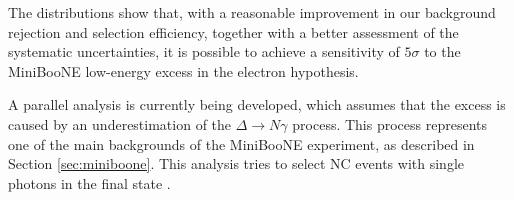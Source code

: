 The distributions show that, with a reasonable improvement in our background rejection and selection efficiency, together with a better assessment of the systematic uncertainties, it is possible to achieve a sensitivity of $5\sigma$ to the MiniBooNE low-energy excess in the electron hypothesis. 

A parallel analysis is currently being developed, which assumes that the excess is caused by an underestimation of the $\Delta\rightarrow N\gamma$ process. This process represents one of the main backgrounds of the MiniBooNE experiment, as described in Section \ref{sec:miniboone}. This analysis tries to select NC events with single photons in the final state \cite{single_photon}.